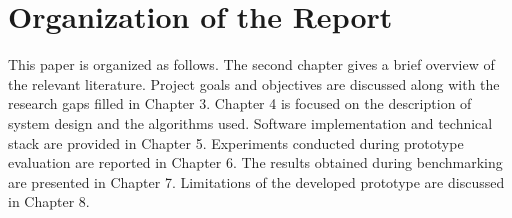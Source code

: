\section{Organization of the Report}
This paper is organized as follows. The second chapter gives a brief overview of the relevant literature. Project goals and objectives are discussed along with the research gaps filled in Chapter 3. Chapter 4 is focused on the description of system design and the algorithms used. Software implementation and technical stack are provided in Chapter 5. Experiments conducted during prototype evaluation are reported in Chapter 6. The results obtained during benchmarking are presented in Chapter 7. Limitations of the developed prototype are discussed in Chapter 8.
